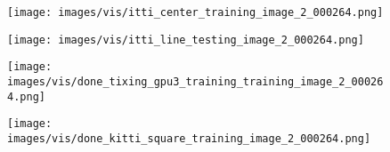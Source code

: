 \documentclass[10pt,twocolumn,letterpaper]{article}
\begin{document}
\begin{figure*}[t]
        \begin{subfigure}[b]{0.23\textwidth}
  \texttt{[image: images/vis/itti\_center\_training\_image\_2\_000264.png]}
    \end{subfigure}%
    \begin{subfigure}[b]{0.23\textwidth}
  \texttt{[image: images/vis/itti\_line\_testing\_image\_2\_000264.png]}
    \end{subfigure}%
    \begin{subfigure}[b]{0.23\textwidth}
  \texttt{[image: images/vis/done\_tixing\_gpu3\_training\_training\_image\_2\_000264.png]}
    \end{subfigure}%
    \begin{subfigure}[b]{0.23\textwidth}
  \texttt{[image: images/vis/done\_kitti\_square\_training\_image\_2\_000264.png]}
    \end{subfigure}%


\end{figure*}
\end{document}
